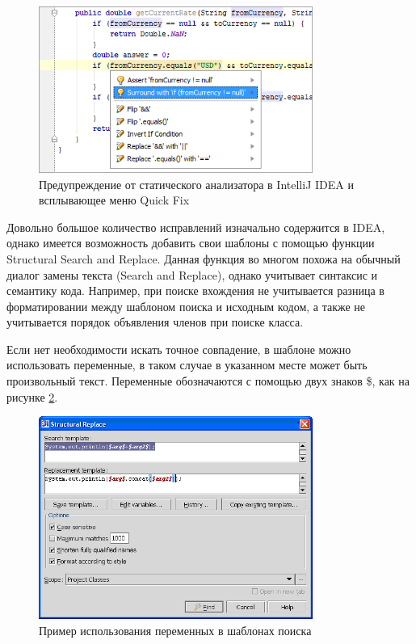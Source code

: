 \begin{figure}[htbp]
	\centering
	\includegraphics[width=0.8\textwidth]{code_analysis_bugs.png}
	\caption{Предупреждение от статического анализатора в IntelliJ IDEA и всплывающее меню Quick Fix}%
	\label{fig:idea}
\end{figure}

Довольно большое количество исправлений изначально содержится в IDEA, однако имеется возможность добавить свои шаблоны с помощью функции Structural Search and Replace\cite{ideaSSR}. Данная функция во многом похожа на обычный диалог замены текста (Search and Replace), однако учитывает синтаксис и семантику кода. Например, при поиске вхождения не учитывается разница в форматировании между шаблоном поиска и исходным кодом, а также не учитывается порядок объявления членов при поиске класса.

Если нет необходимости искать точное совпадение, в шаблоне можно использовать переменные, в таком случае в указанном месте может быть произвольный текст. Переменные обозначаются с помощью двух знаков \$, как на рисунке \ref{fig:ssr}.

\begin{figure}[H]
	\centering
	\includegraphics[width=0.8\textwidth]{ssr.png}
	\caption{Пример использования переменных в шаблонах поиска}%
	\label{fig:ssr}
\end{figure}

